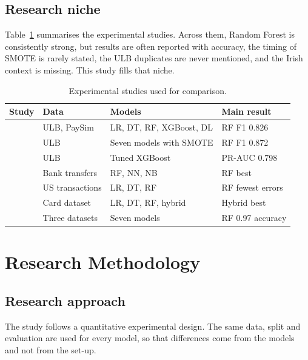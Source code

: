 \documentclass[12pt,a4paper]{article}
\begin{document}
\subsection{Research niche}
Table~\ref{tab:lit} summarises the experimental studies. Across them, Random Forest is consistently strong, but results are often reported with accuracy, the timing of SMOTE is rarely stated, the ULB duplicates are never mentioned, and the Irish context is missing. This study fills that niche.

\begin{table}[H]
\centering\small
\caption{Experimental studies used for comparison.}\label{tab:lit}
\begin{tabular}{p{4.3cm}p{3.1cm}p{3.6cm}p{3.1cm}}
\toprule
Study & Data & Models & Main result \\
\midrule
\citet{albalawi2025enhancing} & ULB, PaySim & LR, DT, RF, XGBoost, DL & RF F1 0.826 \\
\citet{andrade2025smote} & ULB & Seven models with SMOTE & RF F1 0.872 \\
\citet{ma2026leakage} & ULB & Tuned XGBoost & PR-AUC 0.798 \\
\citet{preciado2025banking} & Bank transfers & RF, NN, NB & RF best \\
\citet{jamil2025bigdata} & US transactions & LR, DT, RF & RF fewest errors \\
\citet{salunke2025hybrid} & Card dataset & LR, DT, RF, hybrid & Hybrid best \\
\citet{alrasheedi2025enhancing} & Three datasets & Seven models & RF 0.97 accuracy \\
\bottomrule
\end{tabular}
\end{table}

\section{Research Methodology}\label{sec:method}

\subsection{Research approach}
The study follows a quantitative experimental design. The same data, split and evaluation are used for every model, so that differences come from the models and not from the set-up.
\end{document}
